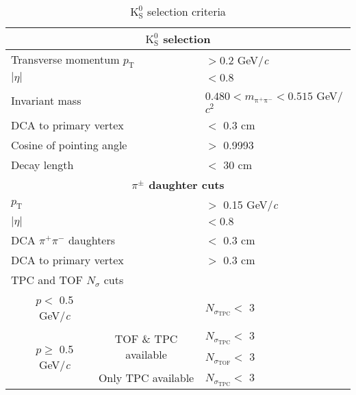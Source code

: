 \documentclass[ALICE,manyauthors]{cernphprep}
\newcommand{\Ks}{$\mathrm{K^{0}_{S}}$\xspace}
\begin{document}
\begin{table}[htbp]
 \centering
 \caption{\Ks selection criteria}
  \renewcommand{\arraystretch}{1.05}
  \begin{tabular}{lc|c|l}
   \hline  
   \multicolumn{4}{c}{\textbf{\Ks selection}} \\
   \hline
   \multicolumn{3}{l|}{Transverse momentum $p_{\mathrm{T}}$} & $> 0.2$ GeV/\textit{c} \\
   \hline
   \multicolumn{3}{l|}{$|\eta|$} & $< 0.8$ \\
   \hline
   \multicolumn{3}{l|}{Invariant mass} & $0.480 < m_{\mathrm{\pi^{+}\pi^{-}}} < 0.515$ GeV/$c^{2}$ \\
   \hline
   \multicolumn{3}{l|}{DCA to primary vertex} & $<$ 0.3 cm \\
   \hline
   \multicolumn{3}{l|}{Cosine of pointing angle} & $>$ 0.9993 \\
   \hline
   \multicolumn{3}{l|}{Decay length} & $<$ 30 cm \\
   \hline
      
   
   \multicolumn{4}{c}{\textbf{$\pi^{\pm}$ daughter cuts}} \\
   \hline
   \multicolumn{3}{l|}{$p_{\mathrm{T}}$} & $>$ 0.15 GeV/\textit{c} \\
   \hline
   \multicolumn{3}{l|}{$|\eta|$} &  $< 0.8$ \\
   \hline
   \multicolumn{3}{l|}{DCA $\pi^{+}\pi^{-}$ daughters} & $<$ 0.3 cm \\
   \hline
   \multicolumn{3}{l|}{DCA to primary vertex} & $>$ 0.3 cm \\
   \hline
   \multicolumn{4}{l}{TPC and TOF $N_{\sigma}$ cuts} \\
   \cline{2-4}
    & \multicolumn{1}{c}{$p <$ 0.5 GeV/\textit{c}} &  & $N_{\sigma_{\mathrm{TPC}}} <$ 3 \\
   \cline{2-4}
    & \multicolumn{1}{c}{\multirow{3}{*}{$p \geq$ 0.5 GeV/\textit{c}}} &  \multirow{2}{*}{TOF \& TPC available} & $N_{\sigma_{\mathrm{TPC}}} <$ 3 \\
    & \multicolumn{2}{c|}{} & $N_{\sigma_{\mathrm{TOF}}} <$ 3 \\
   \cline{3-4}
    & \multicolumn{1}{c}{} & Only TPC available & $N_{\sigma_{\mathrm{TPC}}} <$ 3 \\
   \hline   
  \end{tabular}
 \label{tab:K0sCuts} 
\end{table}
\end{document}

